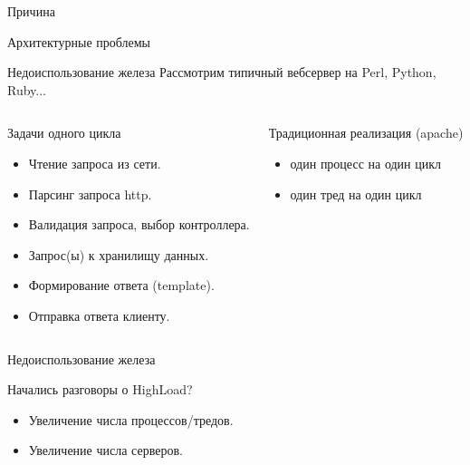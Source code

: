 \documentclass[aspectratio=169]{beamer}
\begin{document}
\begin{frame}{Причина}
    \begin{block}
        {\huge Архитектурные проблемы}
    \end{block}
\end{frame}

\begin{frame}{Недоиспользование железа}
    Рассмотрим типичный вебсервер на Perl, Python, Ruby...
    \pause

    \begin{columns}
        \begin{block}{Задачи одного цикла}
            \begin{itemize}
                \item Чтение запроса из сети.
                \item Парсинг запроса http.
                \item Валидация запроса, выбор контроллера.
                \item Запрос(ы) к хранилищу данных.
                \item Формирование ответа (template).
                \item Отправка ответа клиенту.
            \end{itemize}
        \end{block}

        \pause
        \begin{block}{Традиционная реализация (apache)}
            \begin{itemize}
                \item один процесс на один цикл
                \item один тред на один цикл
            \end{itemize}

        \end{block}
    \end{columns}
\end{frame}


\begin{frame}{Недоиспользование железа}
    \begin{block}{Начались разговоры о HighLoad?}
        \begin{itemize}
            \item Увеличение числа процессов/тредов.
            \item Увеличение числа серверов.
        \end{itemize}
    \end{block}
\end{frame}
\end{document}
